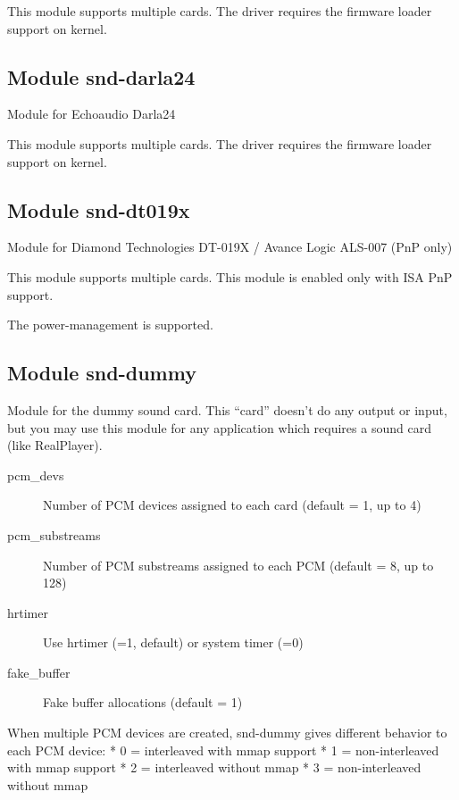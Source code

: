 \documentclass[a4paper,8pt,english]{sphinxmanual}
\begin{document}
This module supports multiple cards.
The driver requires the firmware loader support on kernel.


\subsection{Module snd-darla24}
\label{sound/alsa-configuration:module-snd-darla24}
Module for Echoaudio Darla24

This module supports multiple cards.
The driver requires the firmware loader support on kernel.


\subsection{Module snd-dt019x}
\label{sound/alsa-configuration:module-snd-dt019x}
Module for Diamond Technologies DT-019X / Avance Logic ALS-007 (PnP
only)

This module supports multiple cards.  This module is enabled only with
ISA PnP support.

The power-management is supported.


\subsection{Module snd-dummy}
\label{sound/alsa-configuration:module-snd-dummy}
Module for the dummy sound card. This ``card'' doesn't do any output
or input, but you may use this module for any application which
requires a sound card (like RealPlayer).
\begin{description}
\item[{pcm\_devs}] \leavevmode
Number of PCM devices assigned to each card (default = 1, up to 4)

\item[{pcm\_substreams}] \leavevmode
Number of PCM substreams assigned to each PCM (default = 8, up to 128)

\item[{hrtimer}] \leavevmode
Use hrtimer (=1, default) or system timer (=0)

\item[{fake\_buffer}] \leavevmode
Fake buffer allocations (default = 1)

\end{description}

When multiple PCM devices are created, snd-dummy gives different
behavior to each PCM device:
* 0 = interleaved with mmap support
* 1 = non-interleaved with mmap support
* 2 = interleaved without mmap
* 3 = non-interleaved without mmap
\end{document}
